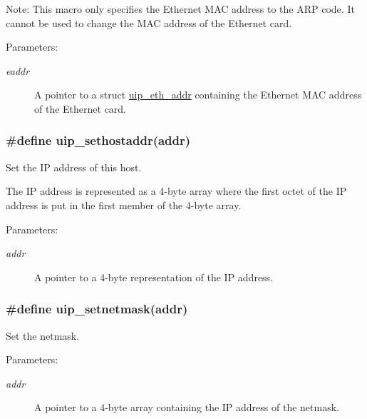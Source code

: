 \begin{Desc}
\item[Note:]This macro only specifies the Ethernet MAC address to the ARP code. It cannot be used to change the MAC address of the Ethernet card.\end{Desc}
\begin{Desc}
\item[Parameters:]
\begin{description}
\item[{\em eaddr}]A pointer to a struct \hyperlink{a00029}{uip\_\-eth\_\-addr} containing the Ethernet MAC address of the Ethernet card. \end{description}
\end{Desc}
\hypertarget{a00061_g12b467f314489259dd718228d0827a51}{
\subsubsection[uip\_\-sethostaddr]{\setlength{\rightskip}{0pt plus 5cm}\#define uip\_\-sethostaddr(addr)}}
\label{a00061_g12b467f314489259dd718228d0827a51}


Set the IP address of this host. 

The IP address is represented as a 4-byte array where the first octet of the IP address is put in the first member of the 4-byte array.

\begin{Desc}
\item[Parameters:]
\begin{description}
\item[{\em addr}]A pointer to a 4-byte representation of the IP address. \end{description}
\end{Desc}
\hypertarget{a00061_geb79c914cf137e6d27fd7583e5a66679}{
\subsubsection[uip\_\-setnetmask]{\setlength{\rightskip}{0pt plus 5cm}\#define uip\_\-setnetmask(addr)}}
\label{a00061_geb79c914cf137e6d27fd7583e5a66679}


Set the netmask. 

\begin{Desc}
\item[Parameters:]
\begin{description}
\item[{\em addr}]A pointer to a 4-byte array containing the IP address of the netmask. \end{description}
\end{Desc}
